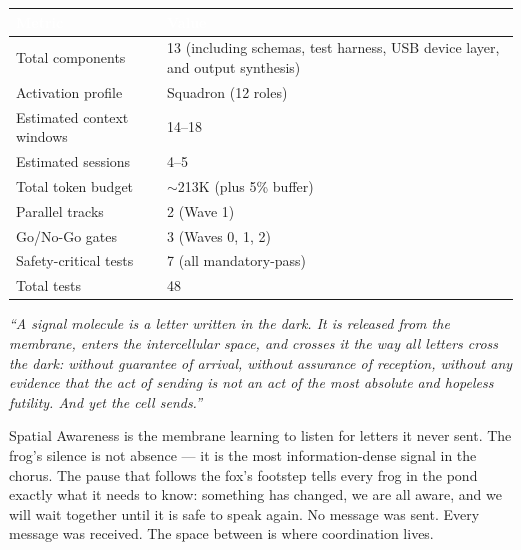 \documentclass[11pt,letterpaper]{article}
\newcommand{\tableheader}[1]{\textbf{\sffamily\textcolor{white}{#1}}}
\begin{document}
\begin{center}
\begin{tabularx}{\textwidth}{L{5cm}X}
\toprule
{}
\tableheader{Metric} & \tableheader{Value} \\
\midrule
Total components & 13 (including schemas, test harness, USB device layer, and output synthesis) \\
Activation profile & Squadron (12 roles) \\
Estimated context windows & 14--18 \\
Estimated sessions & 4--5 \\
Total token budget & $\sim$213K (plus 5\% buffer) \\
Parallel tracks & 2 (Wave 1) \\
Go/No-Go gates & 3 (Waves 0, 1, 2) \\
Safety-critical tests & 7 (all mandatory-pass) \\
Total tests & 48 \\
\bottomrule
\end{tabularx}
\end{center}

\vspace{1em}

\begin{quotebox}
\textit{``A signal molecule is a letter written in the dark. It is released from the membrane, enters the intercellular space, and crosses it the way all letters cross the dark: without guarantee of arrival, without assurance of reception, without any evidence that the act of sending is not an act of the most absolute and hopeless futility. And yet the cell sends.''}

\vspace{0.5em}

Spatial Awareness is the membrane learning to listen for letters it never sent. The frog's silence is not absence --- it is the most information-dense signal in the chorus. The pause that follows the fox's footstep tells every frog in the pond exactly what it needs to know: something has changed, we are all aware, and we will wait together until it is safe to speak again. No message was sent. Every message was received. The space between is where coordination lives.
\end{quotebox}
\end{document}
